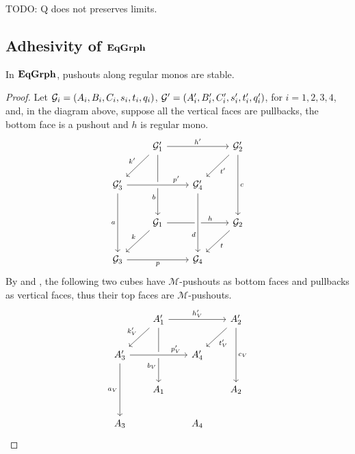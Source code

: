 \begin{example}
	TODO: Q does not preserves limits.
\end{example}

\subsection{Adhesivity of $\mathbf{EqGrph}$}

\begin{lemma}\label{lemma:reg_push_stable}
	In $\mathbf{EqGrph}$, pushouts along regular monos are stable.
\end{lemma}

\begin{proof}
	Let $\mathcal{G}_i = (A_i, B_i, C_i, s_i, t_i, q_i)$, $\mathcal{G}'=(A_i', B_i', C_i', s_i', t_i', q_i')$, for $i = 1, 2, 3, 4$, and, in the diagram above, suppose all the vertical faces are pullbacks, the bottom face is a pushout and $h$ is regular mono.
	\[\begin{tikzcd}[row sep=23, column sep =23]
	& {\mathcal{G}_1'} && {\mathcal{G}_2'} \\
	{\mathcal{G}_3'} && {\mathcal{G}_4'} \\
	& {\mathcal{G}_1} && {\mathcal{G}_2} \\
	{\mathcal{G}_3} && {\mathcal{G}_4}
	\arrow["{h'}", from=1-2, to=1-4]
	\arrow["{k'}"', from=1-2, to=2-1]
	\arrow["b"'{pos=0.7}, from=1-2, to=3-2]
	\arrow["{t'}", from=1-4, to=2-3]
	\arrow["c", from=1-4, to=3-4]
	\arrow["{p'}"{pos=0.8}, from=2-1, to=2-3, crossing over]
	\arrow["a"', from=2-1, to=4-1]
	\arrow["h"{pos=0.7}, from=3-2, to=3-4]
	\arrow["d"'{pos=0.7}, from=2-3, to=4-3, crossing over]
	\arrow["k"', from=3-2, to=4-1]
	\arrow["t", from=3-4, to=4-3]
	\arrow["p"', from=4-1, to=4-3]
	\end{tikzcd}\]
	By  and , the following two cubes have $\mathcal{M}$-pushouts as bottom faces and pullbacks as vertical faces, thus their top faces are $\mathcal{M}$-pushouts.
	\[\begin{tikzcd}[row sep=20, column sep = 20]
	& {A_1'} && {A_2'} \\
	{A_3'} && {A_4'} \\
	& {A_1} && {A_2} \\
	{A_3} && {A_4}
	\arrow["{h'_V}", from=1-2, to=1-4]
	\arrow["{k'_V}"', from=1-2, to=2-1]
	\arrow["{b_V}"'{pos=0.7}, from=1-2, to=3-2]
	\arrow["{t'_V}", from=1-4, to=2-3]
	\arrow["{c_V}", from=1-4, to=3-4]
	\arrow["{p'_V}"{pos=0.8}, from=2-1, to=2-3, crossing over]
	\arrow["{a_V}"', from=2-1, to=4-1]

\end{tikzcd}\]
\end{proof}
